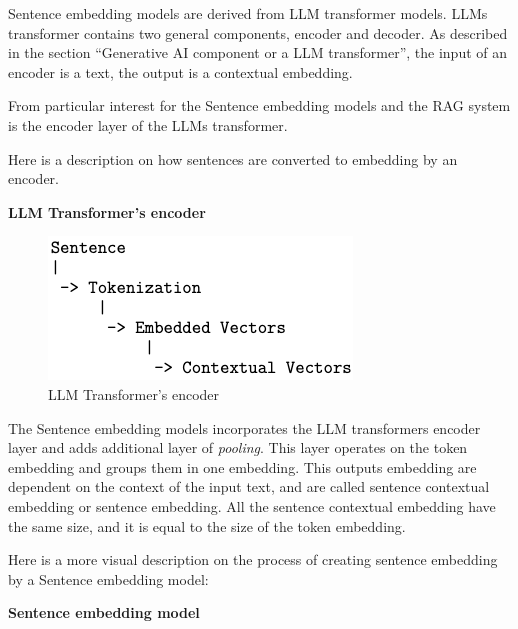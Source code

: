 \documentclass{wseas}
\begin{document}
Sentence embedding models are derived from LLM transformer models. LLMs
transformer contains two general components, encoder and decoder. As
described in the section ``Generative AI component or a LLM
transformer'', the input of an encoder is a text, the output is a
contextual embedding.

From particular interest for the Sentence embedding models and the RAG
system is the encoder layer of the LLMs transformer.

Here is a description on how sentences are converted to embedding by an
encoder.

\textbf{LLM Transformer's encoder}

\begin{figure}[htbp]{}
  \centering
  \includegraphics[width=\linewidth]{resources/v1/transformerEncoder.png}
  \caption{LLM Transformer's encoder}
  \label{fig:encoder_layer_figure}
\end{figure}

The Sentence embedding models incorporates the LLM transformers encoder
layer and adds additional layer of \emph{pooling}. This layer operates
on the token embedding and groups them in one embedding. This outputs
embedding are dependent on the context of the input text, and are called
sentence contextual embedding or sentence embedding. All the sentence
contextual embedding have the same size, and it is equal to the size of
the token embedding.


Here is a more visual description on the process of creating sentence
embedding by a Sentence embedding model:

\textbf{Sentence embedding model}

\end{document}
